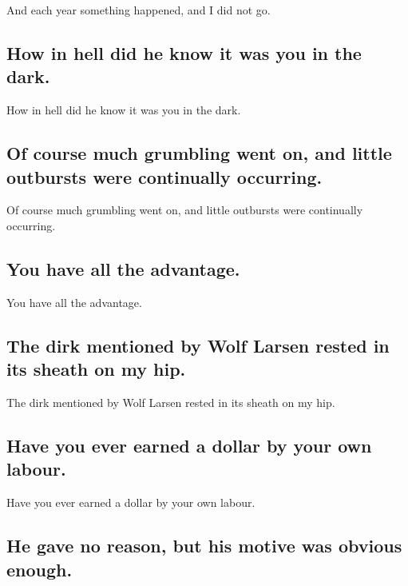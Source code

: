 \documentclass[]{article}
\begin{document}
And each year something happened, and I did not go.

\hypertarget{how-in-hell-did-he-know-it-was-you-in-the-dark.}{%
\subsection{How in hell did he know it was you in the
dark.}\label{how-in-hell-did-he-know-it-was-you-in-the-dark.}}

How in hell did he know it was you in the dark.

\hypertarget{of-course-much-grumbling-went-on-and-little-outbursts-were-continually-occurring.}{%
\subsection{Of course much grumbling went on, and little outbursts were
continually
occurring.}\label{of-course-much-grumbling-went-on-and-little-outbursts-were-continually-occurring.}}

Of course much grumbling went on, and little outbursts were continually
occurring.

\hypertarget{you-have-all-the-advantage.}{%
\subsection{You have all the
advantage.}\label{you-have-all-the-advantage.}}

You have all the advantage.

\hypertarget{the-dirk-mentioned-by-wolf-larsen-rested-in-its-sheath-on-my-hip.}{%
\subsection{The dirk mentioned by Wolf Larsen rested in its sheath on my
hip.}\label{the-dirk-mentioned-by-wolf-larsen-rested-in-its-sheath-on-my-hip.}}

The dirk mentioned by Wolf Larsen rested in its sheath on my hip.

\hypertarget{have-you-ever-earned-a-dollar-by-your-own-labour.}{%
\subsection{Have you ever earned a dollar by your own
labour.}\label{have-you-ever-earned-a-dollar-by-your-own-labour.}}

Have you ever earned a dollar by your own labour.

\hypertarget{he-gave-no-reason-but-his-motive-was-obvious-enough.}{%
\subsection{He gave no reason, but his motive was obvious
enough.}\label{he-gave-no-reason-but-his-motive-was-obvious-enough.}}
\end{document}
